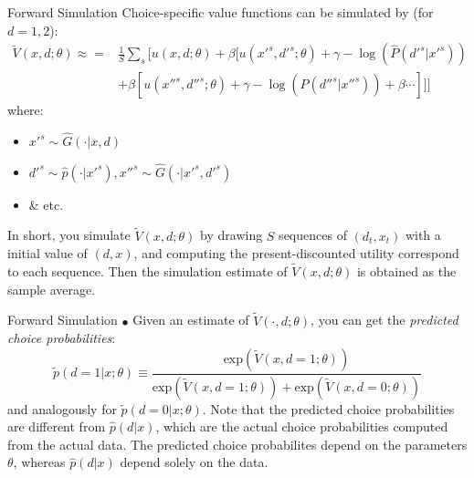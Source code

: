 \documentclass[xcolor=pdftex,dvipsnames,table,mathserif]{beamer}
\begin{document}
\begin{frame}{Forward Simulation}
Choice-specific value functions can be simulated by (for $d=1,2$): 
\begin{eqnarray*}
\tilde V (x, d; \theta) \approx = & \frac 1 S \sum_s [ u(x, d;\theta) + \beta [ u(x'^s, d'^s;\theta) + \gamma - \log(\hat P(d'^s|x'^s)) \\
& +\beta [ u(x''^s, d''^s;\theta) + \gamma - \log (\hat P (d''^s |x''^s)) + \beta \cdots ]]]
\end{eqnarray*}
where:
\begin{itemize}
\item $x'^s \sim \hat G(\cdot | x, d)$ 
\item $d'^s \sim \hat p(\cdot | x'^s), x''^s \sim \hat G(\cdot | x'^s, d'^s)$ 
\item \& etc. 
\end{itemize}
In short, you simulate $\tilde V (x, d;\theta)$ by drawing $S$ \alert{sequences} of $(d_t, x_t)$ with a initial value of $(d, x)$, and computing the present-discounted utility correspond to each sequence. Then the simulation estimate of $\tilde V (x, d;\theta)$ is obtained as the sample average. 
\end{frame}


\begin{frame}{Forward Simulation}
$\bullet$ Given an estimate of $\tilde V (\cdot, d; \theta)$, you can get the \emph{predicted choice probabilities}: 
\begin{equation}
\tilde p (d =1 |x ; \theta) \equiv \frac {\text{exp} \left ( \tilde V (x, d=1; \theta) \right )}{\text{exp} \left ( \tilde V (x, d=1 ;\theta) \right ) + \text{exp} \left ( \tilde V (x, d= 0 ;\theta ) \right )}
\end{equation}
and analogously for $\tilde p (d = 0 |x ; \theta)$. Note that the predicted choice probabilities are different from $\hat p (d|x)$, which are the actual choice probabilities computed from the actual data. The predicted choice probabilites depend on the parameters $\theta$, whereas $\hat p (d|x)$ depend solely on the data. 
\end{frame}
\end{document}
